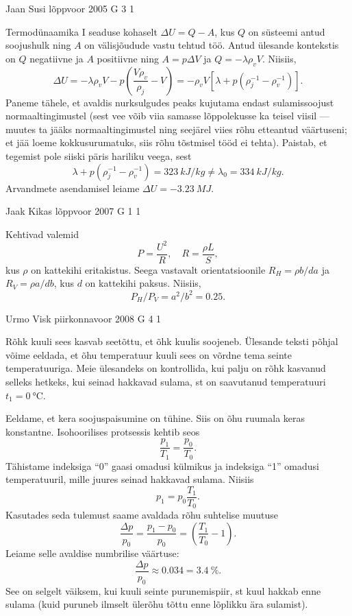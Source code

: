 \documentclass[11pt]{article}
\begin{document}
{%
{Jaan Susi} %
{lõppvoor} %
{2005} %
{G 3} %
{1} %
{

\ifSolution
Termodünaamika I seaduse kohaselt $\Delta U = Q - A$, kus $Q$ on süsteemi antud soojushulk ning $A$ on välisjõudude vastu tehtud töö. Antud ülesande kontekstis on $Q$ negatiivne ja $A$ positiivne ning $A = p\Delta V$ ja $Q = -\lambda \rho_vV$. Niisiis,
\[
\Delta U=-\lambda \rho_{v} V-p\left(\frac{V \rho_{v}}{\rho_{j}}-V\right)=-\rho_{v} V\left[\lambda+p\left(\rho_{j}^{-1}-\rho_{v}^{-1}\right)\right].
\]
Paneme tähele, et avaldis nurksulgudes peaks kujutama endast sulamissoojust normaaltingimustel (sest vee võib viia samasse lõppolekusse ka teisel viisil --- muutes ta jääks normaaltingimustel ning seejärel viies rõhu etteantud väärtuseni; et jää loeme kokkusurumatuks, siis rõhu tõstmisel tööd ei tehta). Paistab, et tegemist pole siiski päris hariliku veega, sest
\[
\lambda+p\left(\rho_{j}^{-1}-\rho_{v}^{-1}\right)= \SI{323}{kJ/kg} \neq \lambda_{0}=\SI{334}{kJ/kg}.
\]
Arvandmete asendamisel leiame $\Delta U = \SI{-3,23}{MJ}$.
\fi
}

{Jaak Kikas} %
{lõppvoor} %
{2007} %
{G 1} %
{1} %
{

\ifSolution
Kehtivad valemid
\[
P=\frac{U^{2}}{R}, \quad R=\frac{\rho L}{S},
\]
kus $\rho$ on kattekihi eritakistus. Seega vastavalt orientatsioonile $R_H = \rho b/da$ ja $R_V = \rho a/db$, kus $d$ on kattekihi paksus. Niisiis,
\[
P_H/P_V = a ^2/b^2 = \num{0,25}.
\]

\fi
}

{Urmo Visk} %
{piirkonnavoor} %
{2008} %
{G 4} %
{1} %
{

\ifSolution
Rõhk kuuli sees kasvab seetõttu, et õhk kuulis soojeneb. Ülesande teksti põhjal võime eeldada, et õhu temperatuur kuuli sees on võrdne tema seinte temperatuuriga. Meie ülesandeks on kontrollida, kui palju on rõhk kasvanud selleks hetkeks, kui seinad hakkavad sulama, st on saavutanud temperatuuri $t_1 = \SI{0}{\celsius}$. 

Eeldame, et kera soojuspaisumine on tühine. Siis on õhu ruumala keras konstantne. Isohoorilises protsessis kehtib seos 
\[
\frac{p_1}{T_1} = \frac{p_0}{T_0}.
\]
Tähistame indeksiga \enquote{0} gaasi omadusi külmikus ja indeksiga \enquote{1} omadusi temperatuuril, mille juures seinad hakkavad sulama. Niisiis 
\[
p_1 = p_0 \frac{T_1}{T_0}.
\] 
Kasutades seda tulemust saame avaldada rõhu suhtelise muutuse 
\[
\frac{\Delta p}{p_{0}}=\frac{p_{1}-p_{0}}{p_{0}}=\left(\frac{T_{1}}{T_{0}}-1\right).
\]
Leiame selle avaldise numbrilise väärtuse: 
\[
\frac{\Delta p}{p_0} \approx \num{0,034} = \SI{3,4}{\%}.
\] 
See on selgelt väiksem, kui kuuli seinte purunemispiir, st kuul hakkab enne sulama (kuid puruneb ilmselt ülerõhu tõttu enne lõplikku ära sulamist). 

}}
\end{document}
